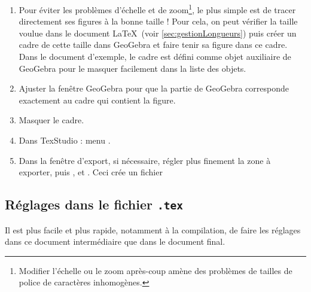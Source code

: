 \begin{enumerate}
	\item Pour éviter les problèmes d'échelle et de zoom\footnote{Modifier l'échelle ou le zoom après-coup amène des problèmes de tailles de police de caractères inhomogènes.}, le plus simple est de tracer directement ses figures à la bonne taille ! Pour cela, on peut vérifier la taille voulue dans le document \LaTeX \ (voir \ref{sec:gestionLongueurs}) puis créer un cadre de cette taille dans GeoGebra et faire tenir sa figure dans ce cadre. Dans le document d'exemple, le cadre est défini comme objet auxiliaire de GeoGebra pour le masquer facilement dans la liste des objets.
	\item Ajuster la fenêtre GeoGebra pour que la partie  de GeoGebra corresponde exactement au cadre qui contient la figure.
	\item Masquer le cadre.
	\item Dans TexStudio : menu  \textrightarrow {} \textrightarrow {}.
	\item Dans la fenêtre d'export, si nécessaire, régler plus finement la zone à exporter, puis \newline {},   et . Ceci crée un fichier 
\end{enumerate}



\subsection{Réglages dans le fichier \texttt{.tex}}


Il est plus facile et plus rapide, notamment à la compilation, de faire les réglages dans ce document intermédiaire que dans le document final.



